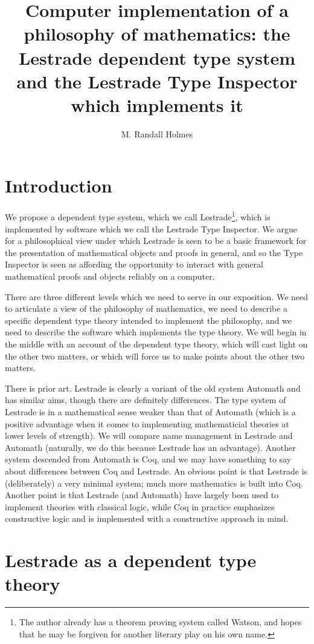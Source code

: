 \documentclass[12pt]{article}
\title{Computer implementation of a philosophy of mathematics:  the Lestrade dependent type system and the Lestrade Type Inspector which implements it}
\author{M. Randall Holmes}
\begin{document}
\maketitle

\section{Introduction}

We propose a dependent type system, which we call Lestrade\footnote{The author already has a theorem proving system called Watson, and hopes that he may be forgiven for another literary play on his own name.}, which is implemented by software which we call the Lestrade Type Inspector.  We argue for a philosophical view under which Lestrade is seen to be a basic framework for the presentation of mathematical objects and proofs in general, and so the Type Inspector is seen as affording the opportunity to interact with general mathematical proofs and objects reliably on a computer.

There are three different levels which we need to serve in our exposition.  We need to articulate a view of the philosophy of mathematics, we need to describe
a specific dependent type theory intended to implement the philosophy, and we need to describe the software which implements the type theory.  We will begin in the middle with an account of the dependent type theory, which will cast light on the other two matters, or which will force us to make points about the other two matters.

There is prior art.  Lestrade is clearly a variant of the old system Automath and has similar aims, though there are definitely differences.  The type system of Lestrade is in a mathematical sense weaker than that of Automath (which is a positive advantage when it comes to implementing mathematicial theories at lower levels of strength).  We will compare name management in Lestrade and Automath (naturally, we do this because Lestrade has an advantage).  Another system descended from Automath is Coq, and we may have something to say about differences between Coq and Lestrade.  An obvious point is that Lestrade is (deliberately) a very minimal system; much more mathematics is built into Coq.  Another point is that Lestrade (and Automath) have largely been used to implement theories with classical logic, while Coq in practice emphasizes constructive logic and is implemented with a constructive approach in mind.

\section{Lestrade as a dependent type theory}
\end{document}
